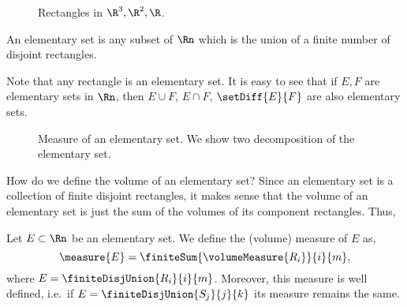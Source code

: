 \begin{figure}
    
    \caption{Rectangles in $\R^3,\R^2,\R$.}\label{fig:tikz:rectangle_in_rn}
\end{figure}

\begin{Definition}[name=Elementary set]
    An elementary set is any subset of $\Rn$ which is the union of a finite number of disjoint rectangles.
\end{Definition}
Note that any rectangle is an elementary set. It is easy to see that if $E,F$ are elementary sets in $\Rn$, then $E\cup F$, $E\cap F$, $\setDiff{E}{F}$ are
also elementary sets.
\begin{figure}
    
    \caption{Measure of an elementary set. We show two decomposition of 
	the elementary set.}\label{fig:tikz:meas_elem_set}
\end{figure}
How do we define the volume of an elementary set? Since an elementary set is a collection of finite disjoint
rectangles, it makes sense that the volume
of an elementary set is just the sum of the volumes of its component rectangles. Thus,
\begin{Theorem}[name=Measure of an elementary set]\label{thm:meas_elem_set}
    Let $E\subset\Rn$ be an elementary set. We define the (volume) measure of $E$ as,
    \[\measure{E} = \finiteSum{\volumeMeasure{R_i}}{i}{m},\]
    where $E = \finiteDisjUnion{R_i}{i}{m}$. Moreover, this measure is well defined, i.e.~if $E =
    \finiteDisjUnion{S_j}{j}{k}$ its measure remains the same.
\end{Theorem}

